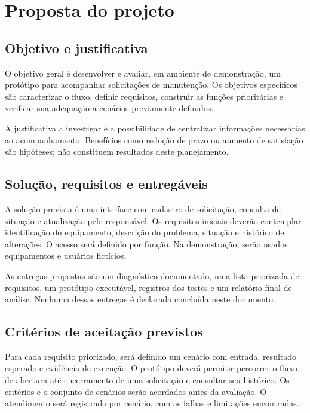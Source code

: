 \chapter{Proposta do projeto}

\section{Objetivo e justificativa}

O objetivo geral é desenvolver e avaliar, em ambiente de demonstração, um
protótipo para acompanhar solicitações de manutenção. Os objetivos específicos
são caracterizar o fluxo, definir requisitos, construir as funções prioritárias
e verificar sua adequação a cenários previamente definidos.

A justificativa a investigar é a possibilidade de centralizar informações
necessárias ao acompanhamento. Benefícios como redução de prazo ou aumento
de satisfação são hipóteses; não constituem resultados deste planejamento.

\section{Solução, requisitos e entregáveis}

A solução prevista é uma interface com cadastro de solicitação, consulta de
situação e atualização pelo responsável. Os requisitos iniciais deverão
contemplar identificação do equipamento, descrição do problema, situação e
histórico de alterações. O acesso será definido por função. Na demonstração,
serão usados equipamentos e usuários fictícios.

As entregas propostas são um diagnóstico documentado, uma lista priorizada
de requisitos, um protótipo executável, registros dos testes e um relatório
final de análise. Nenhuma dessas entregas é declarada concluída neste documento.

\section{Critérios de aceitação previstos}

Para cada requisito priorizado, será definido um cenário com entrada, resultado
esperado e evidência de execução. O protótipo deverá permitir percorrer o
fluxo de abertura até encerramento de uma solicitação e consultar seu histórico.
Os critérios e o conjunto de cenários serão acordados antes da avaliação.
O atendimento será registrado por cenário, com as falhas e limitações encontradas.

